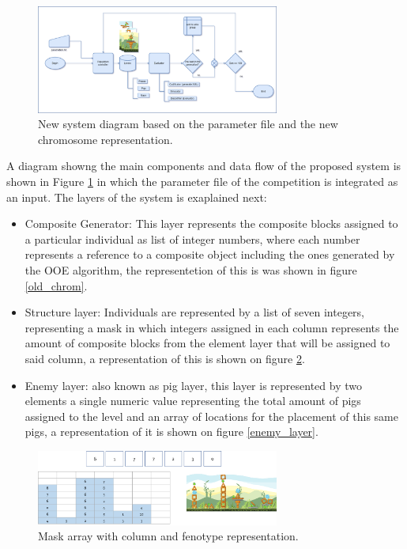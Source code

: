 \documentclass[conference]{IEEEtran}
\begin{document}
    \begin{figure}[htbp]
    \centerline{\includegraphics[width=80mm]{Images/new_model_v2.png}}
    \caption{New system diagram based on the parameter file and the new chromosome representation.}
    \label{new_model}
    \end{figure}
    
    A diagram showng the main components and data flow of the proposed system
    is shown in Figure \ref{new_model} in which the parameter file of the competition 
    is integrated as an input. The layers of the system is exaplained next:
    
    \begin{itemize}
        \item Composite Generator:  This layer represents the composite blocks
        assigned to a particular individual as list of integer numbers, where
        each number represents a reference to a composite object including the
        ones generated by the OOE algorithm, the representetion of this is was
        shown in figure \ref{old_chrom}.
        \item Structure layer: Individuals are represented by a list of seven
        integers, representing a mask in which integers assigned in each column
        represents the amount of composite blocks from the element layer that
        will be assigned to said column, a representation of this is shown on
        figure \ref{mask_layer}.
        \item Enemy layer: also known as pig layer, this layer is represented by
        two elements a single numeric value representing the total amount of
        pigs assigned to the level and an array of locations for the placement
        of this same pigs, a representation of it is shown on figure
        \ref{enemy_layer}. 
    \end{itemize}
    
    \begin{figure}[htbp]
        \centerline{\includegraphics[width=80mm]{Images/mask_layer.png}}
        \caption{Mask array with column and fenotype representation.}
        \label{mask_layer}
    \end{figure}
    
\end{document}
